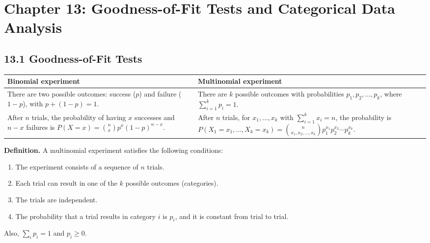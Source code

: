\section*{Chapter 13: Goodness-of-Fit Tests and Categorical Data Analysis}

\subsection*{13.1 Goodness-of-Fit Tests}

\begin{center}
\begin{tabular}{p{}p{}}
\toprule
\textbf{Binomial experiment} & \textbf{Multinomial experiment}\\
\midrule
There are two possible outcomes: success ($p$) and failure ($1-p$), with $p+(1-p)=1$. &
There are $k$ possible outcomes with probabilities $p_1,p_2,\dots,p_k$, where $\sum_{i=1}^k p_i=1$.\\[1ex]
After $n$ trials, the probability of having $x$ successes and $n-x$ failures is
$P(X=x)=\binom{n}{x}p^x(1-p)^{n-x}$. &
After $n$ trials, for $x_1,\dots,x_k$ with $\sum_{i=1}^k x_i=n$, the probability is
$P(X_1=x_1,\dots,X_k=x_k)=\binom{n}{x_1,x_2,\dots,x_k}p_1^{x_1}p_2^{x_2}\cdots p_k^{x_k}$.\\
\bottomrule
\end{tabular}
\end{center}

\textbf{Definition.} A multinomial experiment satisfies the following conditions:
\begin{enumerate}
  \item The experiment consists of a sequence of $n$ trials.
  \item Each trial can result in one of the $k$ possible outcomes (categories).
  \item The trials are independent.
  \item The probability that a trial results in category $i$ is $p_i$, and it is constant from trial to trial.
\end{enumerate}
Also, $\sum_i p_i=1$ and $p_i\ge0$.

